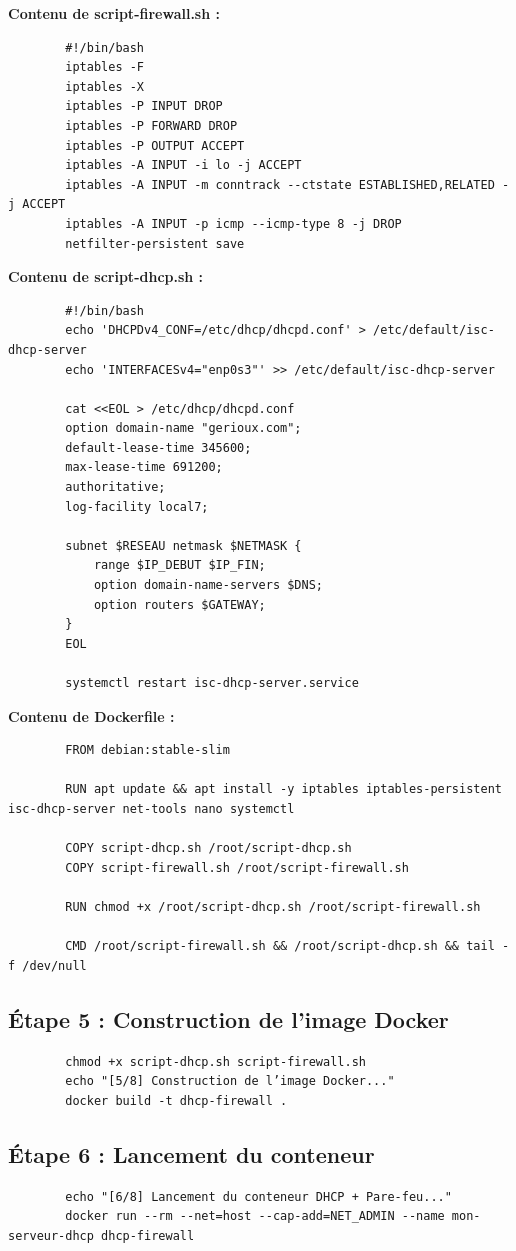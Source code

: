 	\textbf{Contenu de script-firewall.sh :}
	\begin{lstlisting}
		#!/bin/bash
		iptables -F
		iptables -X
		iptables -P INPUT DROP
		iptables -P FORWARD DROP
		iptables -P OUTPUT ACCEPT
		iptables -A INPUT -i lo -j ACCEPT
		iptables -A INPUT -m conntrack --ctstate ESTABLISHED,RELATED -j ACCEPT
		iptables -A INPUT -p icmp --icmp-type 8 -j DROP
		netfilter-persistent save
	\end{lstlisting}
	
	\textbf{Contenu de script-dhcp.sh :}
	\begin{lstlisting}
		#!/bin/bash
		echo 'DHCPDv4_CONF=/etc/dhcp/dhcpd.conf' > /etc/default/isc-dhcp-server
		echo 'INTERFACESv4="enp0s3"' >> /etc/default/isc-dhcp-server
		
		cat <<EOL > /etc/dhcp/dhcpd.conf
		option domain-name "gerioux.com";
		default-lease-time 345600;
		max-lease-time 691200;
		authoritative;
		log-facility local7;
		
		subnet $RESEAU netmask $NETMASK {
			range $IP_DEBUT $IP_FIN;
			option domain-name-servers $DNS;
			option routers $GATEWAY;
		}
		EOL
		
		systemctl restart isc-dhcp-server.service
	\end{lstlisting}
	
	\textbf{Contenu de Dockerfile :}
	\begin{lstlisting}
		FROM debian:stable-slim
		
		RUN apt update && apt install -y iptables iptables-persistent isc-dhcp-server net-tools nano systemctl
		
		COPY script-dhcp.sh /root/script-dhcp.sh
		COPY script-firewall.sh /root/script-firewall.sh
		
		RUN chmod +x /root/script-dhcp.sh /root/script-firewall.sh
		
		CMD /root/script-firewall.sh && /root/script-dhcp.sh && tail -f /dev/null
	\end{lstlisting}
	
	\subsection*{Étape 5 : Construction de l’image Docker}
	\begin{lstlisting}
		chmod +x script-dhcp.sh script-firewall.sh
		echo "[5/8] Construction de l’image Docker..."
		docker build -t dhcp-firewall .
	\end{lstlisting}
	
	\subsection*{Étape 6 : Lancement du conteneur}
	\begin{lstlisting}
		echo "[6/8] Lancement du conteneur DHCP + Pare-feu..."
		docker run --rm --net=host --cap-add=NET_ADMIN --name mon-serveur-dhcp dhcp-firewall
	\end{lstlisting}
	
